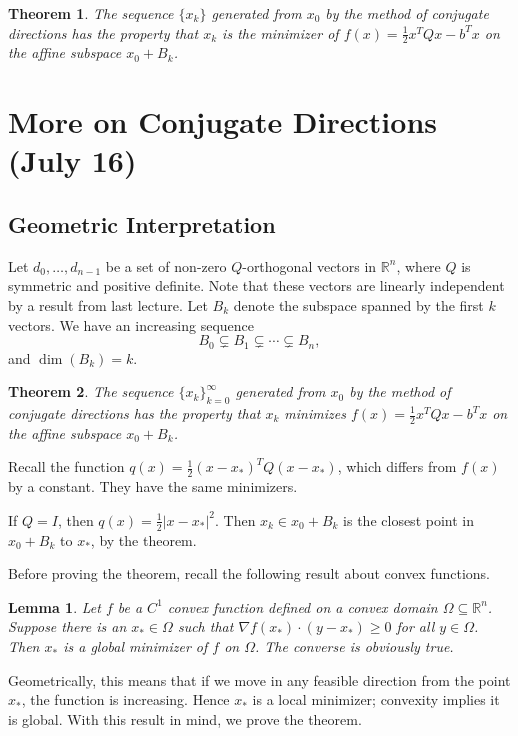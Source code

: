 \documentclass[11pt]{book}
\newcommand{\R}{\mathbb{R}}
\newtheorem{theorem}{Theorem}[subsection]
\newtheorem{lemma}{Lemma}[subsection]
\begin{document}
\begin{theorem}
The sequence $\{x_k\}$ generated from $x_0$ by the method of conjugate directions has the property that $x_k$ is the minimizer of $f(x) = \frac{1}{2}x^TQx - b^Tx$ on the affine subspace $x_0 + B_k$.
\end{theorem}

\newpage

\section{More on Conjugate Directions (July 16)}

\subsection{Geometric Interpretation}

Let $d_0, \dots, d_{n-1}$ be a set of non-zero $Q$-orthogonal vectors in $\R^n$, where $Q$ is symmetric and positive definite. Note that these vectors are linearly independent by a result from last lecture. Let $B_k$ denote the subspace spanned by the first $k$ vectors. We have an increasing sequence
\[
B_0 \subsetneq B_1 \subsetneq \cdots \subsetneq B_n,
\]
and $\dim(B_k) = k$.

\begin{theorem}
The sequence $\{x_k\}_{k=0}^\infty$ generated from $x_0$ by the method of conjugate directions has the property that $x_k$ minimizes $f(x) = \frac{1}{2}x^TQx - b^Tx$ on the affine subspace $x_0 + B_k$.
\end{theorem}

Recall the function $q(x) = \frac{1}{2}(x-x_*)^TQ(x-x_*)$, which differs from $f(x)$ by a constant. They have the same minimizers.

If $Q = I$, then $q(x) = \frac{1}{2}|x-x_*|^2$. Then $x_k \in x_0 + B_k$ is the closest point in $x_0 + B_k$ to $x_*$, by the theorem.

Before proving the theorem, recall the following result about convex functions.

\begin{lemma}
Let $f$ be a $C^1$ convex function defined on a convex domain $\Omega \subseteq \R^n$. Suppose there is an $x_* \in \Omega$ such that $\nabla f(x_*) \cdot (y - x_*) \geq 0$ for all $y \in \Omega$. Then $x_*$ is a global minimizer of $f$ on $\Omega$. The converse is obviously true.
\end{lemma}

Geometrically, this means that if we move in any feasible direction from the point $x_*$, the function is increasing. Hence $x_*$ is a local minimizer; convexity implies it is global. With this result in mind, we prove the theorem.
\end{document}
